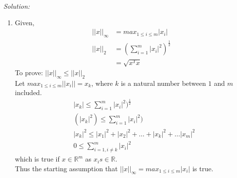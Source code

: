 \documentclass[fleqn]{article}
\newenvironment{solution}
    {\textit{Solution:}}
    {}
\begin{document}
\begin{solution}
    \begin{enumerate}[label=(\alph*)]
        \item Given,
        \begin{equation*}
            \begin{split}
                ||x||_{\infty} &= max_{1 \leq i \leq m} |x_i|\\
                ||x||_{2} &= (\sum_{i=1}^{m}|x_i|^{2})^{\frac{1}{2}}\\
                &= \sqrt{x^{T}x}
            \end{split}
        \end{equation*}
        To prove: $||x||_{\infty} \leq ||x||_{2}$\\
        Let $max_{1 \leq i \leq m}  ||x_i|| = x_k$, where $k$ is a natural number between $1$ and $m$ included.\\
        \begin{equation*}
            \begin{split}
                &|x_k| \leq \sum_{i=1}^{m}|x_i|^{2})^{\frac{1}{2}}\\
                &(|x_k|^{2}) \leq \sum_{i=1}^{m}|x_i|^{2})\\
                &|x_k|^2 \leq |x_1|^{2} +|x_2|^{2} + \dots + |x_k|^{2} + \dots |x_m|^{2}\\
                &0 \leq \sum_{i = 1, i \neq k}^{m} |x_i|^{2}
            \end{split}
        \end{equation*}
        which is true if $x \in \mathbb{R}^{m}$ as $x_{i}s \in \mathbb{R}$.\\
        Thus the starting assumption that $||x||_{\infty} = max_{1 \leq i \leq m} |x_i|$ is true.


\end{enumerate}
\end{solution}
\end{document}
